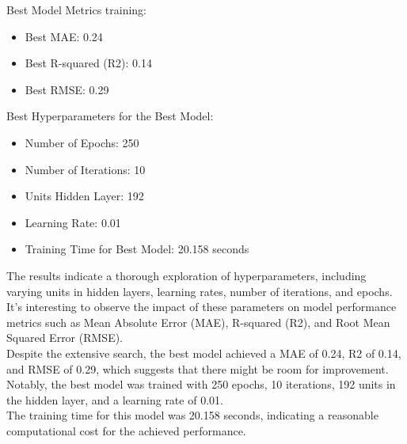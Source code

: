 \documentclass[10pt]{article} %
\begin{document}
Best Model Metrics training:
    \begin{itemize}
        \item Best MAE: 0.24

        \item Best R-squared (R2): 0.14

        \item Best RMSE: 0.29

    \end{itemize}
    Best Hyperparameters for the Best Model:
    \begin{itemize}
        \item Number of Epochs: 250
        \item Number of Iterations: 10
        \item Units Hidden Layer: 192
        \item Learning Rate: 0.01
        \item Training Time for Best Model: 20.158 seconds
    \end{itemize}
    The results indicate a thorough exploration of hyperparameters, including varying units in hidden layers, learning rates, number of iterations, and epochs. 
    \\It's interesting to observe the impact of these parameters on model performance metrics such as Mean Absolute Error (MAE), R-squared (R2), and Root Mean Squared Error (RMSE).
    \\Despite the extensive search, the best model achieved a MAE of 0.24, R2 of 0.14, and RMSE of 0.29, which suggests that there might be room for improvement.
    Notably, the best model was trained with 250 epochs, 10 iterations, 192 units in the hidden layer, and a learning rate of 0.01. 
    \\The training time for this model was 20.158 seconds, indicating a reasonable computational cost for the achieved performance.
\end{document}
